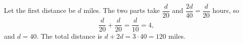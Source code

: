 Let the first distance be $d$ miles. The two parts take $\dfrac{d}{20}$ and $\dfrac{2d}{40}=\dfrac{d}{20}$ hours, so
\[\dfrac{d}{20}+\dfrac{d}{20}=\dfrac{d}{10}=4,\]
and $d=40$. The total distance is $d+2d=3\cdot40=\boxed{120}$ miles.

